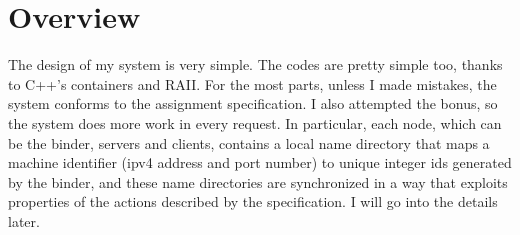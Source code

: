 \section{Overview}
The design of my system is very simple.
The codes are pretty simple too, thanks to C++'s containers and RAII.
For the most parts, unless I made mistakes, the system conforms to the assignment specification.
I also attempted the bonus, so the system does more work in every request.
In particular, each node, which can be the binder, servers and clients, contains a local name directory that maps a machine identifier (ipv4 address and port number) to unique integer ids generated by the binder, and these name directories are synchronized in a way that exploits properties of the actions described by the specification.
I will go into the details later.
